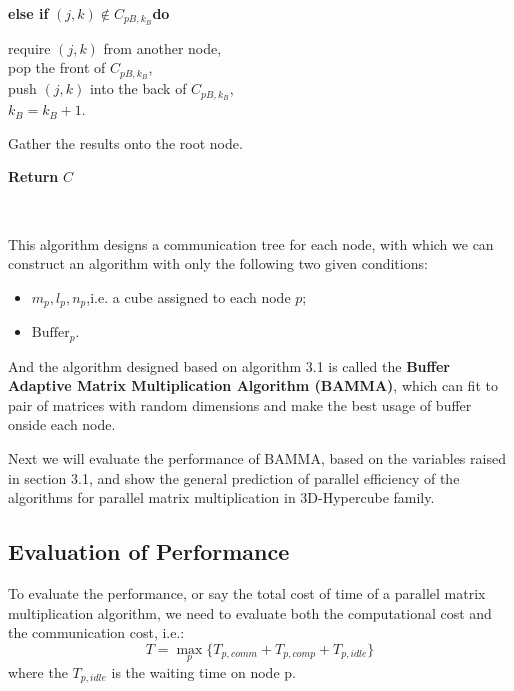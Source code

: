 \documentclass{amsart}
\theoremstyle{definition}
\theoremstyle{remark}
\numberwithin{equation}{section}
\begin{document}
\begin{algorithm}[h]
\begin{adjustwidth}{1cm}{0cm}
\begin{adjustwidth}{1cm}{0cm}
		\textbf{else if }$(j,k)\notin C_{pB,k_B}$\textbf{do}
			\begin{adjustwidth}{1cm}{0cm}
			require $(j,k)$ from another node,\\
			pop the front of $C_{pB,k_B}$,\\
			push $(j,k)$ into the back of $C_{pB,k_B}$,\\
			$k_B=k_B+1$.
			\end{adjustwidth}
		\end{adjustwidth}
	Gather the results onto the root node.
	\end{adjustwidth}

\begin{adjustwidth}{0cm}{1cm} 
\textbf{Return } $C$\\
\end{adjustwidth}
\end{algorithm}
~\\
\par
This algorithm designs a communication tree for each node, with which we can construct an algorithm with only the following two given conditions:
\begin{itemize}
\item $m_p,l_p,n_p$,i.e. a cube assigned to each node $p$;
\item $\text{Buffer}_p$.
\end{itemize}
\par
And the algorithm designed based on algorithm 3.1 is called the \textbf{Buffer Adaptive Matrix Multiplication Algorithm (BAMMA)}, which can fit to pair of matrices with random dimensions and make the best usage of buffer onside each node.\par
Next we will evaluate the performance of BAMMA, based on the variables raised in section 3.1, and show the general prediction of parallel efficiency of the algorithms for parallel matrix multiplication in 3D-Hypercube family.\par

\subsection{Evaluation of Performance}
To evaluate the performance, or say the total cost of time of a parallel matrix multiplication algorithm, we need to evaluate both the computational cost and the communication cost, i.e.:
\begin{equation}
T=\max \limits_{p}\{T_{p,comm}+T_{p,comp}+T_{p,idle}\} 
\end{equation}
where the $T_{p,idle}$ is the waiting time on node p.\par
\end{document}
